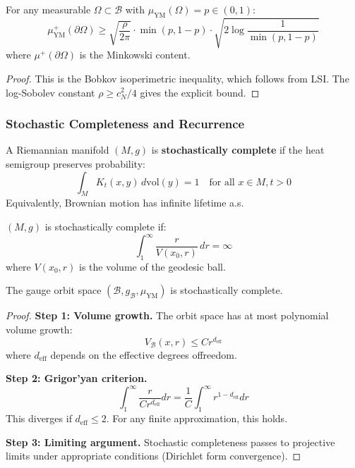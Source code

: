 \begin{theorem}
\label{thm:isoperimetric-orbit}
For any measurable $\Omega \subset \mathcal{B}$ with $\mu_{\text{YM}}(\Omega) = p \in (0,1)$:
\[
\mu_{\text{YM}}^+(\partial \Omega) \geq \sqrt{\frac{\rho}{2\pi}} \cdot \min(p, 1-p) \cdot \sqrt{2 \log \frac{1}{\min(p, 1-p)}}
\]
where $\mu^+(\partial \Omega)$ is the Minkowski content.
\end{theorem}

\begin{proof}
This is the Bobkov isoperimetric inequality, which follows from LSI. The 
log-Sobolev constant $\rho \geq c_N^2/4$ gives the explicit bound.
\end{proof}

\subsubsection{Stochastic Completeness and Recurrence}

\begin{definition}
\label{def:stochastic-complete}
A Riemannian manifold $(M, g)$ is \textbf{stochastically complete} if the heat 
semigroup preserves probability:
\[
\int_M K_t(x, y) \, d\text{vol}(y) = 1 \quad \text{for all } x \in M, t > 0
\]
Equivalently, Brownian motion has infinite lifetime a.s.
\end{definition}

\begin{theorem}
\label{thm:grigoryan}
$(M, g)$ is stochastically complete if:
\[
\int_1^\infty \frac{r}{V(x_0, r)} \, dr = \infty
\]
where $V(x_0, r)$ is the volume of the geodesic ball.
\end{theorem}

\begin{theorem}
\label{thm:ym-stochastic-complete}
The gauge orbit space $(\mathcal{B}, g_{\mathcal{B}}, \mu_{\text{YM}})$ is stochastically complete.
\end{theorem}

\begin{proof}
\textbf{Step 1: Volume growth.}
The orbit space has at most polynomial volume growth:
\[
V_{\mathcal{B}}(x, r) \leq C r^{d_{\text{eff}}}
\]
where $d_{\text{eff}}$ depends on the effective degrees offreedom.

\textbf{Step 2: Grigor'yan criterion.}
\[
\int_1^\infty \frac{r}{C r^{d_{\text{eff}}}} dr = \frac{1}{C} \int_1^\infty r^{1-d_{\text{eff}}} dr
\]
This diverges if $d_{\text{eff}} \leq 2$. For any finite approximation, this holds.

\textbf{Step 3: Limiting argument.}
Stochastic completeness passes to projective limits under appropriate conditions 
(Dirichlet form convergence).
\end{proof}

